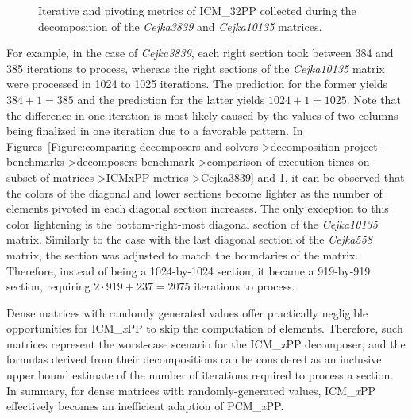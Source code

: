 \begin{figure}[ht!]
\begin{subfigure}[t]{0.48\textwidth}
		\label{Figure:comparing-decomposers-and-solvers->decomposition-project-benchmarks->decomposers-benchmark->comparison-of-execution-times-on-subset-of-matrices->ICMxPP-metrics->Cejka10135}
	\end{subfigure}
	\caption{Iterative and pivoting metrics of ICM\_32PP collected during the decomposition of the \textit{Cejka3839} and \textit{Cejka10135} matrices.}
	\label{Figure:comparing-decomposers-and-solvers->decomposition-project-benchmarks->decomposers-benchmark->comparison-of-execution-times-on-subset-of-matrices->ICMxPP-metrics->Cejka3839-and-Cejka10135}
\end{figure}

For example, in the case of \textit{Cejka3839}, each right section took between 384 and 385 iterations to process, whereas the right sections of the \textit{Cejka10135} matrix were processed in 1024 to 1025 iterations.
The prediction for the former yields $384 + 1 = 385$ and the prediction for the latter yields $1024 + 1 = 1025$.
Note that the difference in one iteration is most likely caused by the values of two columns being finalized in one iteration due to a favorable pattern.
In Figures~\ref{Figure:comparing-decomposers-and-solvers->decomposition-project-benchmarks->decomposers-benchmark->comparison-of-execution-times-on-subset-of-matrices->ICMxPP-metrics->Cejka3839} and \ref{Figure:comparing-decomposers-and-solvers->decomposition-project-benchmarks->decomposers-benchmark->comparison-of-execution-times-on-subset-of-matrices->ICMxPP-metrics->Cejka10135}, it can be observed that the colors of the diagonal and lower sections become lighter as the number of elements pivoted in each diagonal section increases.
The only exception to this color lightening is the bottom-right-most diagonal section of the \textit{Cejka10135} matrix.
Similarly to the case with the last diagonal section of the \textit{Cejka558} matrix, the section was adjusted to match the boundaries of the matrix.
Therefore, instead of being a 1024-by-1024 section, it became a 919-by-919 section, requiring $2\cdot 919 + 237 = 2075$ iterations to process.

Dense matrices with randomly generated values offer practically negligible opportunities for ICM\_\textit{x}PP to skip the computation of elements.
Therefore, such matrices represent the worst-case scenario for the ICM\_\textit{x}PP decomposer, and the formulas derived from their decompositions can be considered as an inclusive upper bound estimate of the number of iterations required to process a section.
In summary, for dense matrices with randomly-generated values, ICM\_\textit{x}PP effectively becomes an inefficient adaption of PCM\_\textit{x}PP.

